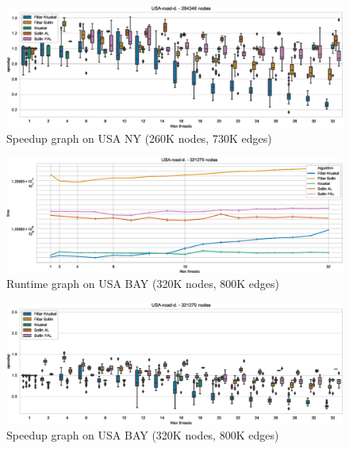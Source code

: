 \documentclass[letterpaper]{article}
\begin{document}
\begin{figure}\centering
  \includegraphics[width=\linewidth]{graphics/Box_Speedup_USA-road-d._264346.eps}
  \caption{Speedup graph on USA NY (260K nodes, 730K edges)\label{usaNYspeedup}}
\end{figure}
  
\begin{figure}\centering
  \includegraphics[width=\linewidth]{graphics/Graph_runtime_USA-road-d._321270.eps}
  \caption{Runtime graph on USA BAY (320K nodes, 800K edges)\label{usaBAYruntime}}
\end{figure}

\begin{figure}\centering
  \includegraphics[width=\linewidth]{graphics/Box_Speedup_USA-road-d._321270.eps}
  \caption{Speedup graph on USA BAY (320K nodes, 800K edges)\label{usaBAYspeedup}}
\end{figure}
\end{document}

